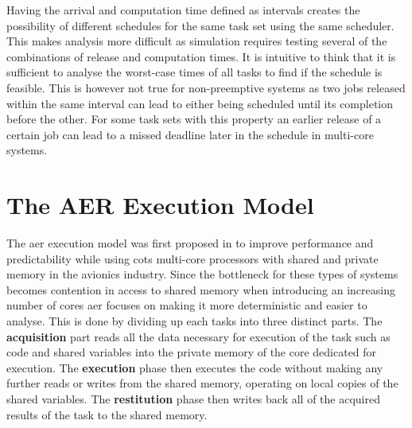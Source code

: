 \documentclass{kththesis}
\begin{document}
Having the arrival and computation time defined as intervals creates the possibility of different
schedules for the same task set using the same scheduler. This makes analysis more difficult as
simulation requires testing several of the combinations of release and computation times. It is
intuitive to think that it is sufficient to analyse the worst-case times of all tasks to find if the
schedule is feasible. This is however not true for non-preemptive systems as two jobs released
within the same interval can lead to either being scheduled until its completion before the other.
For some task sets with this property an earlier release of a certain job can lead to a missed
deadline later in the schedule in multi-core systems.


\section{The AER Execution Model}

The \acrfull{aer} execution model was first proposed in \parencite{durrieu_predictable_2014} to
improve performance and predictability while using \acrshort{cots} multi-core processors with shared
and private memory in the avionics industry. Since the bottleneck for these types of systems becomes
contention in access to shared memory when introducing an increasing number of cores \acrshort{aer}
focuses on making it more deterministic and easier to analyse. This is done by dividing up each
tasks into three distinct parts. The \textbf{acquisition} part reads all the data necessary for
execution of the task such as code and shared variables into the private memory of the core
dedicated for execution. The \textbf{execution} phase then executes the code without making any
further reads or writes from the shared memory, operating on local copies of the shared variables.
The \textbf{restitution} phase then writes back all of the acquired results of the task to the
shared memory.
\end{document}
